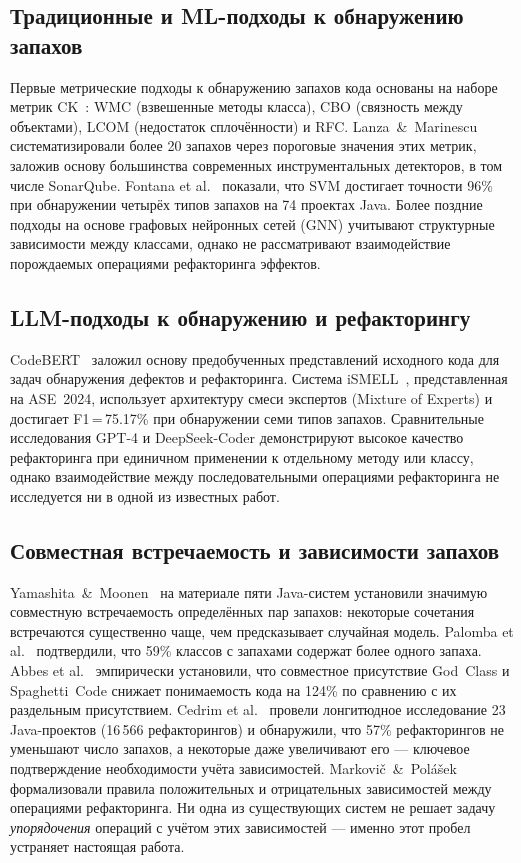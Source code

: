 \documentclass[conference]{IEEEtran}
\begin{document}
\subsection{Традиционные и ML-подходы к обнаружению запахов}

Первые метрические подходы к обнаружению запахов кода основаны на наборе
метрик CK~\cite{ck1994}: WMC (взвешенные методы класса), CBO (связность
между объектами), LCOM (недостаток сплочённости) и RFC.
Lanza~\&~Marinescu~\cite{lanza2006} систематизировали более 20 запахов через
пороговые значения этих метрик, заложив основу большинства современных
инструментальных детекторов, в том числе SonarQube.
Fontana et al.~\cite{fontana2016} показали, что SVM достигает точности 96\%
при обнаружении четырёх типов запахов на 74 проектах Java.
Более поздние подходы на основе графовых нейронных сетей (GNN) учитывают
структурные зависимости между классами, однако не рассматривают взаимодействие
порождаемых операциями рефакторинга эффектов.

\subsection{LLM-подходы к обнаружению и рефакторингу}

CodeBERT~\cite{codebert2020} заложил основу предобученных представлений
исходного кода для задач обнаружения дефектов и рефакторинга.
Система iSMELL~\cite{ismell2024}, представленная на ASE~2024, использует
архитектуру смеси экспертов (Mixture of Experts) и достигает
F1\,=\,75.17\% при обнаружении семи типов запахов.
Сравнительные исследования GPT-4 и DeepSeek-Coder демонстрируют высокое
качество рефакторинга при единичном применении к отдельному методу или
классу, однако взаимодействие между последовательными операциями
рефакторинга не исследуется ни в одной из известных работ.

\subsection{Совместная встречаемость и зависимости запахов}

Yamashita~\&~Moonen~\cite{yamashita2013} на материале пяти Java-систем
установили значимую совместную встречаемость определённых пар запахов:
некоторые сочетания встречаются существенно чаще, чем предсказывает
случайная модель.
Palomba et al.~\cite{palomba2018} подтвердили, что 59\% классов с запахами
содержат более одного запаха.
Abbes et al.~\cite{abbes2011} эмпирически установили, что совместное
присутствие God~Class и Spaghetti~Code снижает понимаемость кода
на 124\% по сравнению с их раздельным присутствием.
Cedrim et al.~\cite{cedrim2017} провели лонгитюдное исследование
23 Java-проектов (16\,566 рефакторингов) и обнаружили, что 57\%
рефакторингов не уменьшают число запахов, а некоторые даже увеличивают
его --- ключевое подтверждение необходимости учёта зависимостей.
Markovič~\&~Polášek~\cite{markovic2020} формализовали правила
положительных и отрицательных зависимостей между операциями рефакторинга.
Ни одна из существующих систем не решает задачу \textit{упорядочения}
операций с учётом этих зависимостей --- именно этот пробел устраняет
настоящая работа.
\end{document}
